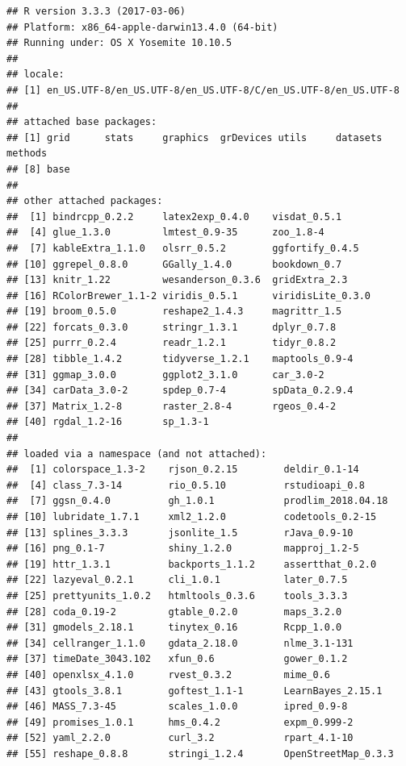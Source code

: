 \documentclass[12pt,a4paper,openany]{book}
\theoremstyle{definition}
\theoremstyle{definition}
\theoremstyle{definition}
\theoremstyle{remark}
\begin{document}
\begin{verbatim}
## R version 3.3.3 (2017-03-06)
## Platform: x86_64-apple-darwin13.4.0 (64-bit)
## Running under: OS X Yosemite 10.10.5
## 
## locale:
## [1] en_US.UTF-8/en_US.UTF-8/en_US.UTF-8/C/en_US.UTF-8/en_US.UTF-8
## 
## attached base packages:
## [1] grid      stats     graphics  grDevices utils     datasets  methods  
## [8] base     
## 
## other attached packages:
##  [1] bindrcpp_0.2.2     latex2exp_0.4.0    visdat_0.5.1      
##  [4] glue_1.3.0         lmtest_0.9-35      zoo_1.8-4         
##  [7] kableExtra_1.1.0   olsrr_0.5.2        ggfortify_0.4.5   
## [10] ggrepel_0.8.0      GGally_1.4.0       bookdown_0.7      
## [13] knitr_1.22         wesanderson_0.3.6  gridExtra_2.3     
## [16] RColorBrewer_1.1-2 viridis_0.5.1      viridisLite_0.3.0 
## [19] broom_0.5.0        reshape2_1.4.3     magrittr_1.5      
## [22] forcats_0.3.0      stringr_1.3.1      dplyr_0.7.8       
## [25] purrr_0.2.4        readr_1.2.1        tidyr_0.8.2       
## [28] tibble_1.4.2       tidyverse_1.2.1    maptools_0.9-4    
## [31] ggmap_3.0.0        ggplot2_3.1.0      car_3.0-2         
## [34] carData_3.0-2      spdep_0.7-4        spData_0.2.9.4    
## [37] Matrix_1.2-8       raster_2.8-4       rgeos_0.4-2       
## [40] rgdal_1.2-16       sp_1.3-1          
## 
## loaded via a namespace (and not attached):
##  [1] colorspace_1.3-2    rjson_0.2.15        deldir_0.1-14      
##  [4] class_7.3-14        rio_0.5.10          rstudioapi_0.8     
##  [7] ggsn_0.4.0          gh_1.0.1            prodlim_2018.04.18 
## [10] lubridate_1.7.1     xml2_1.2.0          codetools_0.2-15   
## [13] splines_3.3.3       jsonlite_1.5        rJava_0.9-10       
## [16] png_0.1-7           shiny_1.2.0         mapproj_1.2-5      
## [19] httr_1.3.1          backports_1.1.2     assertthat_0.2.0   
## [22] lazyeval_0.2.1      cli_1.0.1           later_0.7.5        
## [25] prettyunits_1.0.2   htmltools_0.3.6     tools_3.3.3        
## [28] coda_0.19-2         gtable_0.2.0        maps_3.2.0         
## [31] gmodels_2.18.1      tinytex_0.16        Rcpp_1.0.0         
## [34] cellranger_1.1.0    gdata_2.18.0        nlme_3.1-131       
## [37] timeDate_3043.102   xfun_0.6            gower_0.1.2        
## [40] openxlsx_4.1.0      rvest_0.3.2         mime_0.6           
## [43] gtools_3.8.1        goftest_1.1-1       LearnBayes_2.15.1  
## [46] MASS_7.3-45         scales_1.0.0        ipred_0.9-8        
## [49] promises_1.0.1      hms_0.4.2           expm_0.999-2       
## [52] yaml_2.2.0          curl_3.2            rpart_4.1-10       
## [55] reshape_0.8.8       stringi_1.2.4       OpenStreetMap_0.3.3

\end{verbatim}
\end{document}
